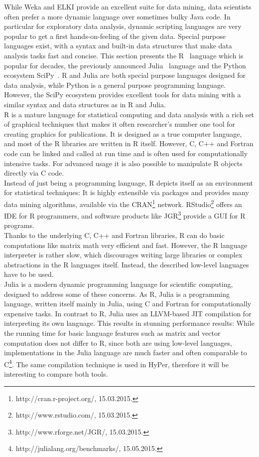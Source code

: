 While Weka and ELKI provide an excellent suite for data mining, data scientists often prefer a more dynamic language over sometimes bulky Java code. In particular for exploratory data analysis, dynamic scripting languages are very popular to get a first hands-on-feeling of the given data. Special purpose languages exist, with a syntax and built-in data structures that make data analysis tasks fast and concise. This section presents the R~\parencite{R/stats} language which is popular for decades, the previously announced Julia~\parencite{DBLP:journals/corr/abs-1209-5145} language and the Python ecosystem SciPy~\parencite{scipy}. R and Julia are both special purpose languages designed for data analysis, while Python is a general purpose programming language. However, the SciPy ecosystem provides excellent tools for data mining with a similar syntax and data structures as in R and Julia.
\\
R is a mature language for statistical computing and data analysis with a rich set of graphical techniques that makes it often researcher's number one tool for creating graphics for publications. It is designed as a true computer language, and most of the R libraries are written in R itself. However, C, C++ and Fortran code can be linked and called at run time and is often used for computationally intensive tasks. For advanced usage it is also possible to manipulate R objects directly via C code.
\\
Instead of just being a programming language, R depicts itself as an environment for statistical techniques: It is highly extensible via packages and provides many data mining algorithms, available via the CRAN\footnote{http://cran.r-project.org/, 15.03.2015.} network. RStudio\footnote{http://www.rstudio.com/, 15.03.2015.} offers an IDE for R programmers, and software products like JGR\footnote{http://www.rforge.net/JGR/, 15.03.2015.} provide a GUI for R programs.
\\
Thanks to the underlying C, C++ and Fortran libraries, R can do basic computations like matrix math very efficient and fast. However, the R language interpreter is rather slow, which discourages writing large libraries or complex abstractions in the R languages itself. Instead, the described low-level languages have to be used.
\\
Julia is a modern dynamic programming language for scientific computing, designed to address some of these concerns. As R, Julia is a programming language, written itself mainly in Julia, using C and Fortran for computationally expensive tasks. In contrast to R, Julia uses an LLVM-based JIT compilation for interpreting its own language. This results in stunning performance results: While the running time for basic language features such as matrix and vector computation does not differ to R, since both are using low-level languages, implementations in the Julia language are much faster and often comparable to C\footnote{http://julialang.org/benchmarks/, 15.05.2015.}. The same compilation technique is used in HyPer, therefore it will be interesting to compare both tools.
